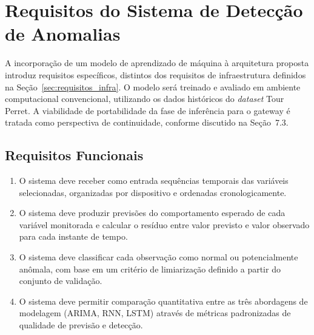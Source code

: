 
\section{Requisitos do Sistema de Detecção de Anomalias}
A incorporação de um modelo de aprendizado de máquina à arquitetura proposta 
introduz requisitos específicos, distintos dos requisitos de infraestrutura 
definidos na Seção~\ref{sec:requisitos_infra}. O modelo será treinado e 
avaliado em ambiente computacional convencional, utilizando os dados 
históricos do \textit{dataset} Tour Perret. A viabilidade de portabilidade 
da fase de inferência para o gateway é tratada como perspectiva de 
continuidade, conforme discutido na Seção~7.3.


\subsection{Requisitos Funcionais}

\begin{enumerate}

    \item[RF1.] O sistema deve receber como entrada sequências temporais das 
    variáveis selecionadas, organizadas por dispositivo e ordenadas 
    cronologicamente.

    \item[RF2.] O sistema deve produzir previsões do comportamento esperado de 
    cada variável monitorada e calcular o resíduo entre valor previsto e 
    valor observado para cada instante de tempo.

    \item[RF3.] O sistema deve classificar cada observação como normal ou 
    potencialmente anômala, com base em um critério de limiarização definido 
    a partir do conjunto de validação.

    \item[RF4.] O sistema deve permitir comparação quantitativa entre as três 
    abordagens de modelagem (ARIMA, RNN, LSTM) através de métricas 
    padronizadas de qualidade de previsão e detecção.

\end{enumerate}


